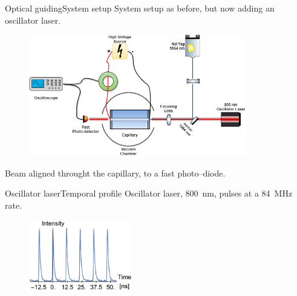 \documentclass[dvipsnames]{beamer}
\begin{document}
  \begin{frame}{Optical guiding}{System setup}
    System setup as before, but now adding an oscillator laser.
    \begin{figure}
     \includegraphics[height=150pt]{figures/results/oscillator/oscillator_system_setup.png} 
    \end{figure}
    Beam aligned throught the capillary, to a fast photo--diode.
  \end{frame}
  \begin{frame}{Oscillator laser}{Temporal profile}
    Oscillator laser, \SI{800}{\nm}, pulses at a \SI{84}{\MHz} rate.
    \begin{figure}
      \includegraphics[width=0.4\textwidth]{figures/results/oscillator/single.PNG}
    \end{figure}
  \end{frame}
\end{document}
